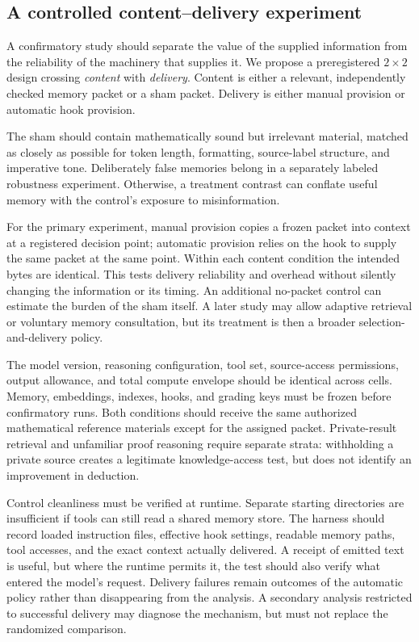 \subsection{A controlled content--delivery experiment}

A confirmatory study should separate the value of the supplied information from the reliability of the machinery that supplies it. We propose a preregistered $2\times2$ design crossing \emph{content} with \emph{delivery}. Content is either a relevant, independently checked memory packet or a sham packet. Delivery is either manual provision or automatic hook provision.

The sham should contain mathematically sound but irrelevant material, matched as closely as possible for token length, formatting, source-label structure, and imperative tone. Deliberately false memories belong in a separately labeled robustness experiment. Otherwise, a treatment contrast can conflate useful memory with the control's exposure to misinformation.

For the primary experiment, manual provision copies a frozen packet into context at a registered decision point; automatic provision relies on the hook to supply the same packet at the same point. Within each content condition the intended bytes are identical. This tests delivery reliability and overhead without silently changing the information or its timing. An additional no-packet control can estimate the burden of the sham itself. A later study may allow adaptive retrieval or voluntary memory consultation, but its treatment is then a broader selection-and-delivery policy.

The model version, reasoning configuration, tool set, source-access permissions, output allowance, and total compute envelope should be identical across cells. Memory, embeddings, indexes, hooks, and grading keys must be frozen before confirmatory runs. Both conditions should receive the same authorized mathematical reference materials except for the assigned packet. Private-result retrieval and unfamiliar proof reasoning require separate strata: withholding a private source creates a legitimate knowledge-access test, but does not identify an improvement in deduction.

Control cleanliness must be verified at runtime. Separate starting directories are insufficient if tools can still read a shared memory store. The harness should record loaded instruction files, effective hook settings, readable memory paths, tool accesses, and the exact context actually delivered. A receipt of emitted text is useful, but where the runtime permits it, the test should also verify what entered the model's request. Delivery failures remain outcomes of the automatic policy rather than disappearing from the analysis. A secondary analysis restricted to successful delivery may diagnose the mechanism, but must not replace the randomized comparison.

